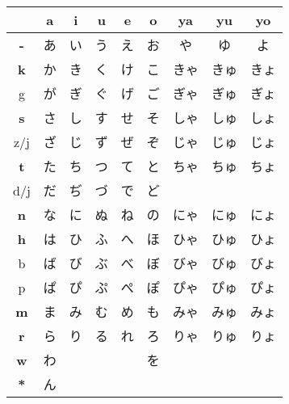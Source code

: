 

\begin{center}

\begin{tabular}{c||c|c|c|c|c||c|c|c|}
&
\textbf{\large a}& \textbf{\large i}& \textbf{\large u}& \textbf{\large e}& \textbf{\large o}&
\textbf{\small ya}& \textbf{\small yu}& \textbf{\small yo}\\ \hline \hline
\textbf{\large -}  &あ &い &う &え &お &や   &ゆ   &よ   \\ \hline
\textbf{\large k}  &か &き &く &け &こ &きゃ &きゅ &きょ \\
{\small g}         &が &ぎ &ぐ &げ &ご &ぎゃ &ぎゅ &ぎょ \\ \hline
\textbf{\large s}  &さ &し &す &せ &そ &しゃ &しゅ &しょ \\
{\small z/j}       &ざ &じ &ず &ぜ &ぞ &じゃ &じゅ &じょ \\ \hline
\textbf{\large t}  &た &ち &つ &て &と &ちゃ &ちゅ &ちょ \\
{\small d/j}       &だ &ぢ &づ &で &ど &     &     &     \\ \hline
\textbf{\large n}  &な &に &ぬ &ね &の &にゃ &にゅ &にょ \\ \hline
\textbf{\large h}  &は &ひ &ふ &へ &ほ &ひゃ &ひゅ &ひょ \\
{\small b}         &ば &び &ぶ &べ &ぼ &びゃ &びゅ &びょ \\
{\small p}         &ぱ &ぴ &ぷ &ぺ &ぽ &ぴゃ &ぴゅ &ぴょ \\ \hline
\textbf{\large m}  &ま &み &む &め &も &みゃ &みゅ &みょ \\ \hline
\textbf{\large r}  &ら &り &る &れ &ろ &りゃ &りゅ &りょ \\ \hline
\textbf{\large w}  &わ &   &   &   &を &     &     &     \\ \hline
\textbf{\large {*}}&ん &   &   &   &   &     &     &     \\ \hline
\end{tabular}
\end{center}
